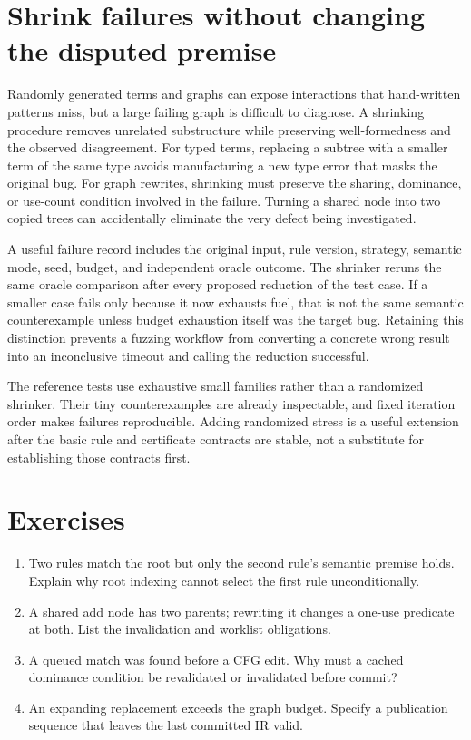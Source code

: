 \section{Shrink failures without changing the disputed premise}
\label{sec:ch85-shrink}
Randomly generated terms and graphs can expose interactions that hand-written patterns miss, but a large failing graph is difficult to diagnose.
A shrinking procedure removes unrelated substructure while preserving well-formedness and the observed disagreement.
For typed terms, replacing a subtree with a smaller term of the same type avoids manufacturing a new type error that masks the original bug.
For graph rewrites, shrinking must preserve the sharing, dominance, or use-count condition involved in the failure.
Turning a shared node into two copied trees can accidentally eliminate the very defect being investigated.

A useful failure record includes the original input, rule version, strategy, semantic mode, seed, budget, and independent oracle outcome.
The shrinker reruns the same oracle comparison after every proposed reduction of the test case.
If a smaller case fails only because it now exhausts fuel, that is not the same semantic counterexample unless budget exhaustion itself was the target bug.
Retaining this distinction prevents a fuzzing workflow from converting a concrete wrong result into an inconclusive timeout and calling the reduction successful.

The reference tests use exhaustive small families rather than a randomized shrinker.
Their tiny counterexamples are already inspectable, and fixed iteration order makes failures reproducible.
Adding randomized stress is a useful extension after the basic rule and certificate contracts are stable, not a substitute for establishing those contracts first.

\section{Exercises}
\label{sec:ch85-exercises}
\begin{enumerate}
\item\label{ex:ch85-priority} Two rules match the root but only the second rule's semantic premise holds.
Explain why root indexing cannot select the first rule unconditionally.
\item\label{ex:ch85-users} A shared add node has two parents; rewriting it changes a one-use predicate at both.
List the invalidation and worklist obligations.
\item\label{ex:ch85-stale} A queued match was found before a CFG edit.
Why must a cached dominance condition be revalidated or invalidated before commit?
\item\label{ex:ch85-budget} An expanding replacement exceeds the graph budget.
Specify a publication sequence that leaves the last committed IR valid.
\end{enumerate}

